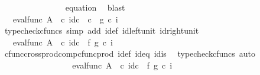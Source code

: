 \begin{isabellebody}
\ \ \ \ \ \ \ \ \ \ \ \ \ \ \isamarkupfalse%
\ equation{}\ \isamarkupfalse%
\ blast\isanewline
\ \ \ \ \ \ \ \ \ \ \ \ \isamarkupfalse%
\ \isamarkupfalse%
\ {\isachardoublequoteopen}{\isachardot}{\kern0pt}{\isachardot}{\kern0pt}{\isachardot}{\kern0pt}\ {\isacharequal}{\kern0pt}\ eval{\isacharunderscore}{\kern0pt}func\ A\ {\isasymOmega}\ {\isasymcirc}\isactrlsub c\ {\isasymlangle}id\isactrlsub c\ {\isasymOmega}\ {\isasymcirc}\isactrlsub c\ \ {\isasymt}{\isacharcomma}{\kern0pt}g\ {\isasymcirc}\isactrlsub c\ i{\isasymrangle}{\isachardoublequoteclose}\isanewline
\ \ \ \ \ \ \ \ \ \ \ \ \ \ \ \ \isamarkupfalse%
\ {\isacharparenleft}{\kern0pt}typecheck{\isacharunderscore}{\kern0pt}cfuncs{\isacharcomma}{\kern0pt}\ simp\ add{\isacharcolon}{\kern0pt}\ i{\isacharunderscore}{\kern0pt}def\ id{\isacharunderscore}{\kern0pt}left{\isacharunderscore}{\kern0pt}unit{}\ id{\isacharunderscore}{\kern0pt}right{\isacharunderscore}{\kern0pt}unit{}{\isacharparenright}{\kern0pt}\isanewline
\ \ \ \ \ \ \ \ \ \ \ \ \isamarkupfalse%
\ \isamarkupfalse%
\ {\isachardoublequoteopen}{\isachardot}{\kern0pt}{\isachardot}{\kern0pt}{\isachardot}{\kern0pt}\ {\isacharequal}{\kern0pt}\ eval{\isacharunderscore}{\kern0pt}func\ A\ {\isasymOmega}\ {\isasymcirc}\isactrlsub c\ {\isacharparenleft}{\kern0pt}{\isacharparenleft}{\kern0pt}id\isactrlsub c\ {\isasymOmega}\ {\isasymtimes}\isactrlsub f\ g{\isacharparenright}{\kern0pt}\ {\isasymcirc}\isactrlsub c\ {\isasymlangle}{\isasymt}{\isacharcomma}{\kern0pt}i{\isasymrangle}{\isacharparenright}{\kern0pt}{\isachardoublequoteclose}\isanewline
\ \ \ \ \ \ \ \ \ \ \ \ \ \ \ \ \isamarkupfalse%
\ cfunc{\isacharunderscore}{\kern0pt}cross{\isacharunderscore}{\kern0pt}prod{\isacharunderscore}{\kern0pt}comp{\isacharunderscore}{\kern0pt}cfunc{\isacharunderscore}{\kern0pt}prod\ i{\isacharunderscore}{\kern0pt}def\ id{}{\isacharunderscore}{\kern0pt}eq\ id{}{\isacharunderscore}{\kern0pt}is\ \isamarkupfalse%
\ {\isacharparenleft}{\kern0pt}typecheck{\isacharunderscore}{\kern0pt}cfuncs{\isacharcomma}{\kern0pt}\ auto{\isacharparenright}{\kern0pt}\isanewline
\ \ \ \ \ \ \ \ \ \ \ \ \isamarkupfalse%
\ \isamarkupfalse%
\ {\isachardoublequoteopen}{\isachardot}{\kern0pt}{\isachardot}{\kern0pt}{\isachardot}{\kern0pt}\ {\isacharequal}{\kern0pt}\ {\isacharparenleft}{\kern0pt}eval{\isacharunderscore}{\kern0pt}func\ A\ {\isasymOmega}\ {\isasymcirc}\isactrlsub c\ {\isacharparenleft}{\kern0pt}id\isactrlsub c\ {\isasymOmega}\ {\isasymtimes}\isactrlsub f\ g{\isacharparenright}{\kern0pt}{\isacharparenright}{\kern0pt}\ {\isasymcirc}\isactrlsub c\ {\isasymlangle}{\isasymt}{\isacharcomma}{\kern0pt}i{\isasymrangle}{\isachardoublequoteclose}\isanewline

\end{isabellebody}
